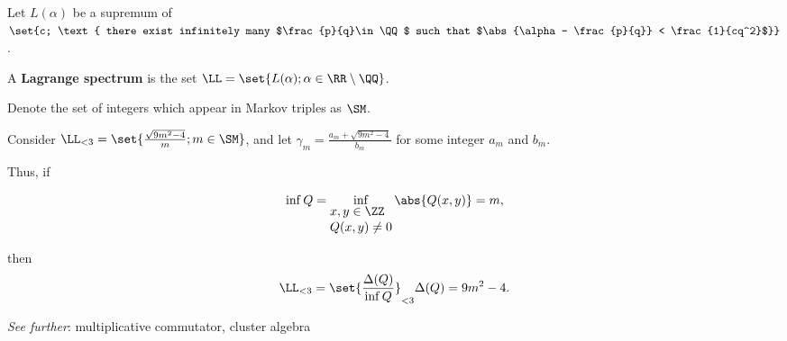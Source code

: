 \documentclass[11pt]{scrartcl}
\begin{document}
Let $L(\alpha)$ be a supremum of $\set{c; \text{ there exist infinitely many $\frac{p}{q}\in \QQ$ such that $\abs{\alpha- \frac{p}{q}} < \frac{1}{cq^2}$}}$.

\begin{definition}
  A \textbf{Lagrange spectrum} is the set
  $\LL = \set{L(\alpha); \alpha \in \RR\setminus\QQ}$.
\end{definition}

Denote the set of integers which appear in Markov triples as $\SM$.

\begin{theorem}
  Consider $\LL_{<3} = \set{\frac{\sqrt{9m^2-4}}{m}; m\in \SM}$, and
  let $\gamma_m = \frac{a_m+\sqrt{9m^2-4}}{b_m}$ for some integer
  $a_m$ and $b_m$.
\end{theorem}

Thus, if 

\[\inf Q = \inf_{\shortstack[l]{$x,y \in
    \ZZ$\\$Q(x, y)\neq 0$}}\abs{Q(x, y)} =m,\]

then 
\begin{equation*}
  \LL_{< 3} = \set{\frac{\Delta(Q)}{\inf Q}}_{< 3}\Delta(Q) = 9m^2-4.
\end{equation*}

\textit{See further}: multiplicative commutator, cluster algebra
\end{document}
